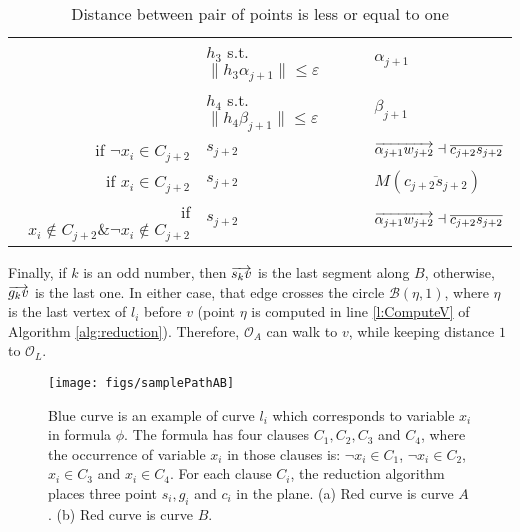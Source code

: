 \documentclass[12pt]{dalthesis}
\def\favoritefont{\bfseries \sffamily}
\def\QED{\ensuremath{{\Box}}}
\def\markatright#1{\leavevmode\unskip\nobreak\quad\hspace*{\fill}{#1}}
\newenvironment{proof}
	{\begin{trivlist}\item[\hskip\labelsep{\favoritefont Proof:}]}
	{\markatright{\QED}\end{trivlist}}
\newcommand{\qed}{}
\newcommand{\eps}{\varepsilon}
\newcommand{\CB}{{\mathscr B}}
\newcommand{\CO}{{\mathscr O}}
\newcommand{\Seg}[1]{{\overline{#1}}}
\newcommand{\cfev}{{l}}
\begin{document}
\begin{proof}
\begin{table}[t]
\begin{tabular}{ r | l | l  }
\hline

	&  $h_3$ s.t.  $\| h_3\alpha_{j+1} \| \le \eps$ & $\alpha_{j+1}$\\
	&  	$h_4$ s.t.  $\| h_4 \beta_{j+1} \| \le \eps$ & $\beta_{j+1}$\\
\hline









 if $\neg x_i \in C_{j+2}$  & $s_{j+2}$ & $\Dir{\alpha_{j+1}w_{j+2}} 	\dashv \Seg{c_{j+2}s_{j+2}}$ \\
   if $ x_i \in C_{j+2}$  & $s_{j+2}$ & $M(\Seg{c_{j+2}s_{j+2}})$\\
   if $x_i \notin C_{j+2} \& \neg x_i \notin C_{j+2}$  & $s_{j+2}$ & $\Dir{\alpha_{j+1}w_{j+2}}	\dashv \Seg{c_{j+2}s_{j+2}}$\\

\end{tabular}
\caption{Distance between pair of points is less or equal to one}
\label{tab:PathA}
\end{table}





Finally, if $k$ is an odd number, then  
$\overrightarrow{s_kv}$ is the last segment along $B$, otherwise, 
$\overrightarrow{g_kv}$ is the last one. In 
either case, 
that edge crosses  the circle $\CB(\eta,1)$, where $\eta$ is the last vertex of 
$\cfev_i$ before $v$ (point $\eta$ is computed in line \ref{l:ComputeV} of 
Algorithm \ref{alg:reduction}). Therefore, 
 $\CO_A$ can walk to $v$, while keeping distance $1$ to $\CO_L$. 


\qed
\end{proof}




\begin{figure}[t]
	\centering
	\texttt{[image: figs/samplePathAB]}
	\caption{
Blue curve is an example of curve $\cfev_i$ which corresponds to variable $x_i$ in  formula $\phi$. The formula has four clauses $C_1, C_2, C_3$ and $C_4$,	 where the occurrence of variable $x_i$  in those clauses is:
$\neg x_i \in C_1$, $ \neg x_i \in C_2$, $x_i \in C_3$ and $x_i \in C_4$.  
For each clause $C_i$, the reduction algorithm places three point $s_i,g_i$ and $c_i$ in the plane. (a) Red curve is curve $A$. 
 (b) Red curve is curve $B$.  }
	\label{fig:pathAExample}
\end{figure}
\end{document}
